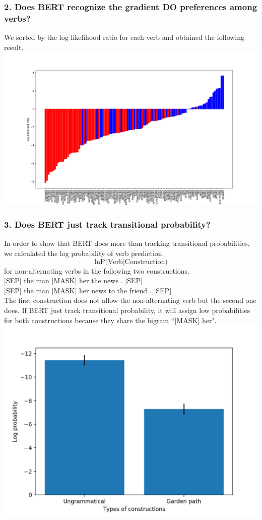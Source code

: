 \documentclass[twocolumn,dvipdfmx, 10pt]{article}
\begin{document}
\subsubsection*{2. Does BERT recognize the gradient DO preferences among verbs?}
We sorted by the log likelihood ratio for each verb and obtained the following result.\\
\includegraphics[keepaspectratio,width = \linewidth]{BERT_individual.png}

\subsubsection*{3. Does BERT just track transitional probability?}
In order to show that BERT does more than tracking transitional probabilities, we calculated the log probability of verb prediction
$$\text{ln}\text{P(Verb} | \text{Construction)}$$
for non-alternating verbs in the following two constructions.\\
$[$SEP$]$ the man $[$MASK$]$ her the news . $[$SEP$]$\\
$[$SEP$]$ the man $[$MASK$]$ her news to the friend . $[$SEP$]$\\
The first construction does not allow the non-alternating verb but the second one does.  If BERT just track transitional probability, it will assign low probabilities for both constructions because they share the bigram ``$[$MASK$]$ her".\\
\includegraphics[keepaspectratio,width = \linewidth]{transition_prob.png}
\end{document}
